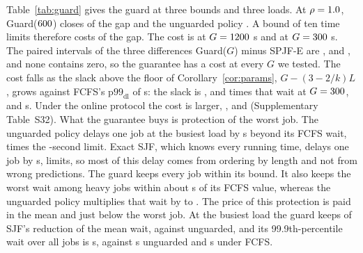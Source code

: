 Table~\ref{tab:guard} gives the guard at three bounds and three loads. At $\rho =
1.0$, Guard($600$) closes  of the gap and the unguarded
policy . A bound of ten time limits therefore costs  of the gap.
The cost is  at $G = 1200$ s and  at $G =
300$ s. The paired intervals of the three differences Guard($G$) minus SPJF-E are
\devnum{$[-0.142, -0.077]$}, \devnum{$[-0.083, -0.052]$} and \devnum{$[-0.526, -0.314]$}, and none
contains zero, so the guarantee has a cost at every $G$ we tested. The cost falls as the
slack above the floor of Corollary~\ref{cor:params}, $G - (3-2/k)L$, grows against FCFS's
$\mathrm{p99}_{\mathrm{dl}}$ of  s: the slack is ,
 and  times that wait at $G = 300$,  and
 s. Under the online protocol
the cost is larger, ,  and
 (Supplementary Table~S32). What the guarantee buys
is protection of the worst job. The unguarded policy delays one job at the busiest load by
 s beyond its FCFS wait,  times the -second limit.
Exact SJF, which knows every running time, delays one job by  s,
 limits, so most of this delay comes from ordering by length and not from
wrong predictions.
The guard keeps every job within its bound. It also keeps the worst wait among heavy jobs
within about  s of its FCFS value, whereas the unguarded policy multiplies that
wait by  to . The price of this protection is paid in the mean and
just below the worst job. At the busiest load the guard keeps  of SJF's reduction of the mean
wait, against  unguarded, and its 99.9th-percentile wait over all jobs is
 s, against  s unguarded and  s under FCFS.

